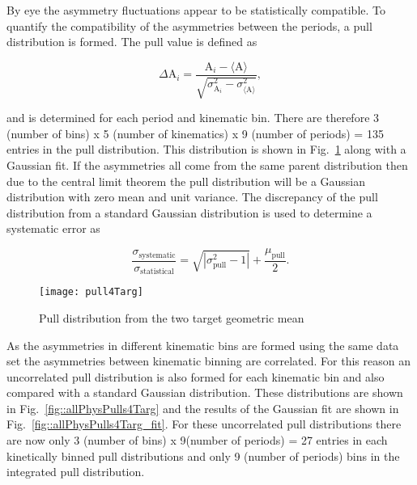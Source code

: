 \noindent
By eye the asymmetry fluctuations appear to be statistically compatible.  To
quantify the compatibility of the asymmetries between the periods, a pull
distribution is formed.  The pull value is defined as

\begin{equation}
  \label{eq::pull}
  \Delta\mathrm{A}_i =
  \frac{
    \mathrm{A}_i - \langle \mathrm{A} \rangle
  }{
    \sqrt{
      \sigma^2_{\mathrm{A}_i} - \sigma^2_{\langle \mathrm{A} \rangle}
    }
  },
\end{equation}

\noindent
and is determined for each period and kinematic bin.  There are therefore 3
(number of bins) x 5 (number of kinematics) x 9 (number of periods) = 135
entries in the pull distribution. This distribution is shown in
Fig.~\ref{fig::pull4Targ} along with a Gaussian fit.  If the asymmetries all
come from the same parent distribution then due to the central limit theorem the
pull distribution will be a Gaussian distribution with zero mean and unit
variance.  The discrepancy of the pull distribution from a standard Gaussian
distribution is used to determine a systematic error as

\begin{equation}
  \label{equ::sysErrorPull}
  \frac{\sigma_{\mathrm{systematic}}}{\sigma_{\mathrm{statistical}}} =
  \sqrt{|\sigma^2_{\mathrm{pull}} - 1|} + \frac{\mu_{\mathrm{pull}}}{2}.
\end{equation}

\begin{figure}[h!t]
  \begin{center}
    \texttt{[image: pull4Targ]}
    \caption{Pull distribution from the two target geometric mean}
    \label{fig::pull4Targ}
  \end{center}
\end{figure}

\noindent
As the asymmetries in different kinematic bins are formed using the same data
set the asymmetries between kinematic binning are correlated.  For this reason
an uncorrelated pull distribution is also formed for each kinematic bin and also
compared with a standard Gaussian distribution.  These distributions are shown
in Fig.~\ref{fig::allPhysPulls4Targ} and the results of the Gaussian fit are
shown in Fig.~\ref{fig::allPhysPulls4Targ_fit}.  For these uncorrelated pull
distributions there are now only 3 (number of bins) x 9(number of periods) = 27
entries in each kinetically binned pull distributions and only 9 (number of
periods) bins in the integrated pull distribution.

